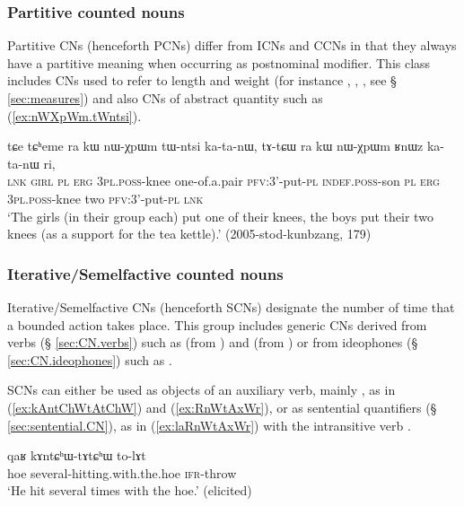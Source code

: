 \subsubsection{Partitive counted nouns} \label{sec:CN.partitive}
Partitive CNs (henceforth PCNs) differ from ICNs and CCNs in that they always have a partitive meaning when occurring as postnominal modifier. This class includes CNs used to refer to length and weight (for instance , , , see § \ref{sec:measures}) and also CNs of abstract quantity such as  (\ref{ex:nWXpWm.tWntsi}).

\begin{exe}
\ex \label{ex:nWXpWm.tWntsi}
\gll tɕe tɕʰeme ra kɯ nɯ-χpɯm tɯ-ntsi ka-ta-nɯ, tɤ-tɕɯ ra kɯ nɯ-χpɯm ʁnɯz ka-ta-nɯ ri,  \\
 \textsc{lnk} \textsc{girl} \textsc{pl} \textsc{erg} \textsc{3pl}.\textsc{poss}-knee one-of.a.pair \textsc{pfv}:3'-put-\textsc{pl} \textsc{indef}.\textsc{poss}-son \textsc{pl} \textsc{erg}  \textsc{3pl}.\textsc{poss}-knee two \textsc{pfv}:3'-put-\textsc{pl} \textsc{lnk} \\
\glt `The girls (in their group each) put one of their knees, the boys put their two knees (as a support for the tea kettle).' (2005-stod-kunbzang, 179)
\end{exe}

\subsubsection{Iterative/Semelfactive counted nouns} \label{sec:CN.iterative}
Iterative/Semelfactive CNs (henceforth SCNs) designate the number of time that a bounded action takes place. This group includes generic CNs derived from verbs (§ \ref{sec:CN.verbs})  such as  (from ) and  (from ) or from ideophones  (§ \ref{sec:CN.ideophones}) such as .

SCNs can either be used as objects of an auxiliary verb, mainly , as in (\ref{ex:kAntChWtAtChW}) and (\ref{ex:RnWtAxWr}), or as sentential quantifiers (§ \ref{sec:sentential.CN}), as in (\ref{ex:laRnWtAxWr}) with the intransitive verb .

\begin{exe}
\ex \label{ex:kAntChWtAtChW}
\gll qaʁ kɤntɕʰɯ-tɤtɕʰɯ to-lɤt \\
hoe several-hitting.with.the.hoe \textsc{ifr}-throw \\
\glt `He hit several times with the hoe.' (elicited)
\end{exe}

